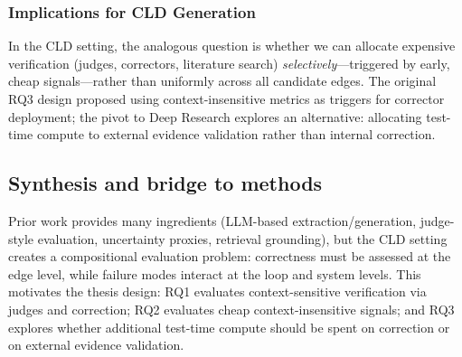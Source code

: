 \subsubsection{Implications for CLD Generation}

In the CLD setting, the analogous question is whether we can allocate expensive verification (judges, correctors, literature search) \emph{selectively}---triggered by early, cheap signals---rather than uniformly across all candidate edges. The original RQ3 design proposed using context-insensitive metrics as triggers for corrector deployment; the pivot to Deep Research explores an alternative: allocating test-time compute to external evidence validation rather than internal correction.

\subsection{Synthesis and bridge to methods}
\label{sec:lit_bridge_to_methods}

Prior work provides many ingredients (LLM-based extraction/generation, judge-style evaluation, uncertainty proxies, retrieval grounding), but the CLD setting creates a compositional evaluation problem: correctness must be assessed at the edge level, while failure modes interact at the loop and system levels. This motivates the thesis design: RQ1 evaluates context-sensitive verification via judges and correction; RQ2 evaluates cheap context-insensitive signals; and RQ3 explores whether additional test-time compute should be spent on correction or on external evidence validation.

